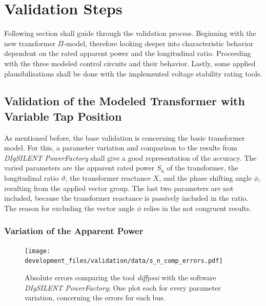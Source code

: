 

\section{Validation Steps}

Following section shall guide through the validation process.
Beginning with the new transformer $\Pi$-model, therefore looking deeper into characteristic behavior dependent on the rated apparent power and the longitudinal ratio.
Proceeding with the three modeled control circuits and their behavior.
Lastly, some applied plausibilisations shall be done with the implemented voltage stability rating tools.

\subsection{Validation of the Modeled Transformer with Variable Tap Position}

As mentioned before, the base validation is concerning the basic transformer model.
For this, a parameter variation and comparison to the results from \textit{DIgSILENT PowerFactory} shall give a good representation of the accuracy.
The varied parameters are the apparent rated power $S_\mathrm{n}$ of the transformer, the longitudinal ratio $\vartheta$, the transformer reactance $X$, and the phase shifting angle $\phi$, resulting from the applied vector group.
The last two parameters are not included, because the transformer reactance is passively included in the ratio.
The reason for excluding the vector angle $\phi$ relies in the not congruent results.

\subsubsection{Variation of the Apparent Power}

\begin{figure}[htbp!]
    \centering
    \texttt{[image: development\_files/validation/data/s\_n\_comp\_errors.pdf]}
    \caption[Model error comparison concerning the variation of the rated apparent power]{Absolute errors comparing the tool \textit{diffpssi} with the software \textit{DIgSILENT PowerFactory}; One plot each for every parameter variation, concerning the errors for each bus.}
    \label{fig:valid-s-errors}
\end{figure}

